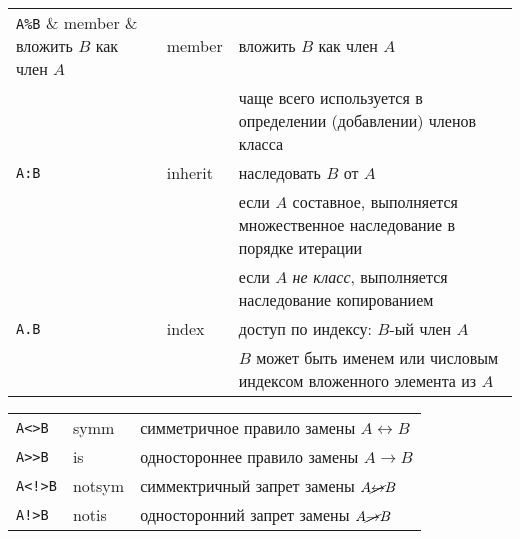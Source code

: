 \noindent\begin{tabular}{l l l}
\verb|A%B| & member & вложить $B$ как член $A$ \\
&&чаще всего используется в определении (добавлении) членов класса\\
\verb|A:B| & inherit & наследовать $B$ от $A$ \\
&&если $A$ составное, выполняется множественное наследование в порядке
итерации\\
&&если $A$ \emph{не класс}, выполняется наследование копированием\\
\verb|A.B| & index & доступ по индексу: $B$-ый член $A$\\
&&$B$ может быть именем или числовым индексом вложенного элемента из $A$\\
\hline
\end{tabular}

\noindent\begin{tabular}{l l l}
\verb|A<>B| & symm & симметричное правило замены $A\leftrightarrow B$\\
\verb|A>>B| & is & одностороннее правило замены $A\rightarrow B$\\
\verb|A<!>B| & notsym & симмектричный запрет замены $A\cancel\leftrightarrow
B$\\
\verb|A!>B| & notis & односторонний запрет замены $A\cancel\rightarrow B$\\
\end{tabular}

\secup




